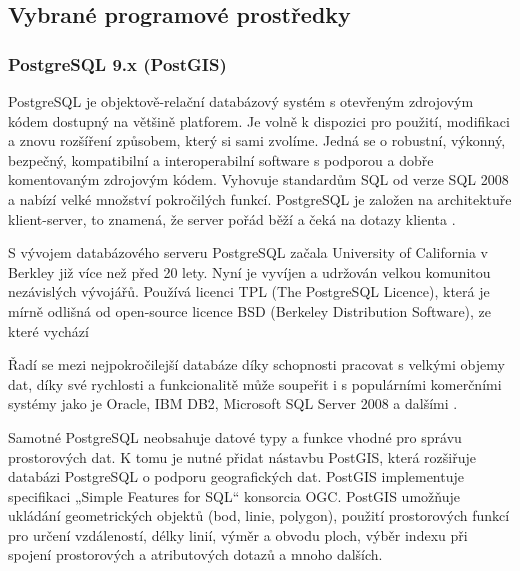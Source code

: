 \subsection{Vybrané programové prostředky}
\label{kPouziteProstredky}

\subsubsection{PostgreSQL 9.x (PostGIS)}
        \label{PostgreSQL}
        PostgreSQL je objektově-relační databázový systém s otevřeným zdrojovým
        kódem dostupný na většině platforem. Je volně k dispozici pro použití,
        modifikaci a znovu rozšíření způsobem, který si sami zvolíme. Jedná se
        o robustní, výkonný, bezpečný, kompatibilní a interoperabilní software
        s podporou a dobře komentovaným zdrojovým kódem. Vyhovuje standardům
        SQL od verze SQL 2008 a nabízí velké množství pokročilých funkcí.
        PostgreSQL je založen na architektuře klient-server, to znamená, že
        server pořád běží a čeká na dotazy klienta \citep{Momjian2001}. 

        S vývojem databázového serveru PostgreSQL začala University of
        California v Berkley již více než před 20 lety. Nyní je vyvíjen a
        udržován velkou komunitou nezávislých vývojářů. Používá licenci TPL
        (The PostgreSQL Licence), která je mírně odlišná od open-source licence
        BSD (Berkeley Distribution Software), ze které vychází
        \citep{RiggsKrossing2010}

        Řadí se mezi nejpokročilejší databáze díky schopnosti pracovat s
        velkými objemy dat, díky své rychlosti a funkcionalitě může soupeřit i
        s populárními komerčními systémy jako je Oracle, IBM DB2, Microsoft SQL
        Server 2008 a dalšími \citep{PostgreSQL2012}.

        Samotné PostgreSQL neobsahuje datové typy a funkce vhodné pro správu
        prostorových dat. K tomu je nutné přidat nástavbu PostGIS, která
        rozšiřuje databázi PostgreSQL o podporu geografických dat. PostGIS
        implementuje specifikaci „Simple Features for SQL“ konsorcia OGC.
        PostGIS umožňuje ukládání geometrických objektů (bod, linie, polygon),
        použití prostorových funkcí pro určení vzdáleností, délky linií, výměr
        a obvodu ploch, výběr indexu při spojení prostorových a atributových
        dotazů a mnoho dalších.

